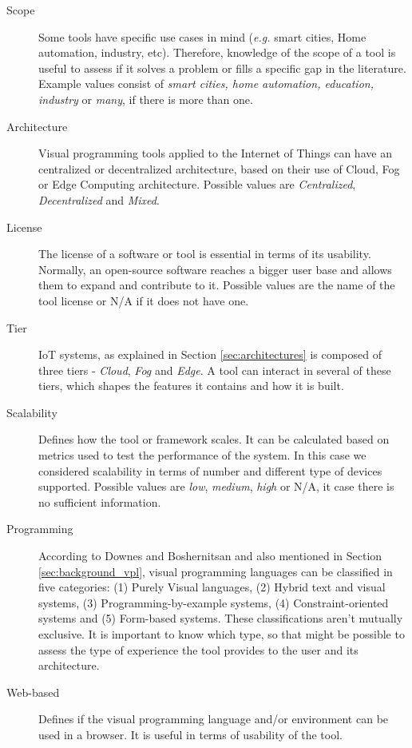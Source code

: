 \begin{description}
    \item [Scope] Some tools have specific use cases in mind (\textit{e.g.} smart cities, Home automation, industry, etc). Therefore, knowledge of the scope of a tool is useful to assess if it solves a problem or fills a specific gap in the literature. Example values consist of \textit{smart cities, home automation, education, industry} or \textit{many}, if there is more than one. 
    \item [Architecture] Visual programming tools applied to the Internet of Things can have an centralized or decentralized architecture, based on their use of Cloud, Fog or Edge Computing architecture. Possible values are \textit{Centralized}, \textit{Decentralized} and \textit{Mixed}.
    \item [License] The license of a software or tool is essential in terms of its usability. Normally, an open-source software reaches a bigger user base and allows them to expand and contribute to it. Possible values are the name of the tool license or N/A if it does not have one.
    \item [Tier] IoT systems, as explained in Section \ref{sec:architectures} is composed of three tiers - \textit{Cloud}, \textit{Fog} and \textit{Edge}. A tool can interact in several of these tiers, which shapes the features it contains and how it is built.
    \item [Scalability] Defines how the tool or framework scales. It can be calculated based on metrics used to test the performance of the system. In this case we considered scalability in terms of number and different type of devices supported. Possible values are \textit{low}, \textit{medium}, \textit{high} or N/A, it case there is no sufficient information.
    \item [Programming] According to Downes and Boshernitsan \cite{vpls_survey} and also mentioned in Section \ref{sec:background_vpl}, visual programming languages can be classified in five categories: (1) Purely Visual languages, (2) Hybrid text and visual systems, (3) Programming-by-example systems, (4) Constraint-oriented systems and (5) Form-based systems. These classifications aren't mutually exclusive. It is important to know which type, so that might be possible to assess the type of experience the tool provides to the user and its architecture.
    \item [Web-based] Defines if the visual programming language and/or environment can be used in a browser. It is useful in terms of usability of the tool.
\end{description}

